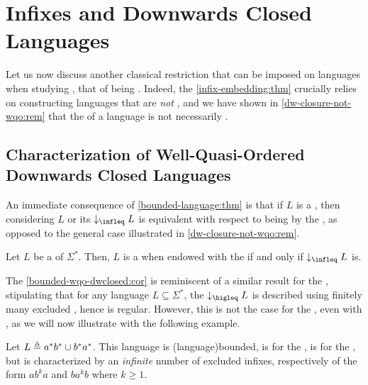 \section{Infixes and Downwards Closed Languages}
\label{infixes-dwclosed:sec}

Let us now discuss another classical restriction that can be imposed on 
languages when studying , that of being
. Indeed, the \cref{infix-embedding:thm}
crucially relies on constructing languages that are \emph{not}
, and we have shown 
in \cref{dw-closure-not-wqo:rem} that the 
of a  language is not necessarily
.

\subsection{Characterization of Well-Quasi-Ordered Downwards Closed Languages}

An immediate consequence of \cref{bounded-language:thm} is that   if $L$ is a
, then considering $L$ or its 
$\dwset[\infleq]{L}$ is equivalent with respect to being
 by the , as opposed to
the general case illustrated in \cref{dw-closure-not-wqo:rem}.

\begin{corollary}
    \label{bounded-wqo-dwclosed:cor}
    Let $L$ be a  of $\Sigma^*$. Then,
    $L$ is a  when endowed with the
     if and only if $\dwset[\infleq]{L}$ is.
\end{corollary}



The \cref{bounded-wqo-dwclosed:cor} is reminiscent of a similar result for the
,  stipulating that for any language $L \subseteq
\Sigma^*$, the  $\dwset[\higleq]{L}$ is described using
finitely many excluded , hence is regular. However, this is not
the case for the , even with , as we
will now illustrate with the following example.

\begin{example}
    \label{dwclosed-wqo-not-finite-excl:ex}
    Let $L \triangleq a^* b^* \cup b^* a^*$. This language is 
    \kl(language){bounded}, is  for the , is  for the
    , but is characterized by an \emph{infinite} number 
    of excluded infixes, respectively of the form $ab^ka$ and $ba^kb$ where $k \geq 1$.
\end{example}


